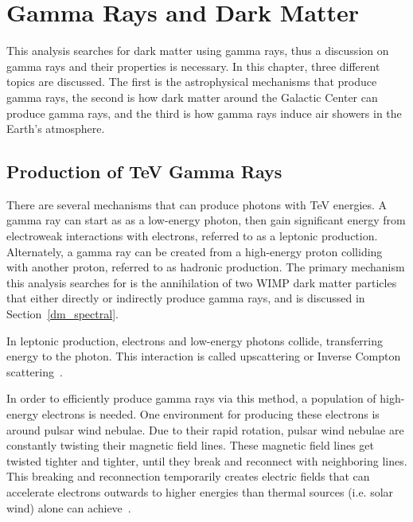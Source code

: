 \cleartooddpage[\thispagestyle{empty}]
\chapter{Gamma Rays and Dark Matter}\label{ch_gamma}


This analysis searches for dark matter using gamma rays, thus a discussion on gamma rays and their properties is necessary.
In this chapter, three different topics are discussed.
The first is the astrophysical mechanisms that produce gamma rays, the second is how dark matter around the Galactic Center can produce gamma rays, and the third is how gamma rays induce air showers in the Earth's atmosphere.

\section{Production of TeV Gamma Rays}

  There are several mechanisms that can produce photons with TeV energies.
  A gamma ray can start as as a low-energy photon, then gain significant energy from electroweak interactions with electrons, referred to as a leptonic production.
  Alternately, a gamma ray can be created from a high-energy proton colliding with another proton, referred to as hadronic production.
  The primary mechanism this analysis searches for is the annihilation of two WIMP dark matter particles that either directly or indirectly produce gamma rays, and is discussed in Section~\ref{dm_spectral}.

  In leptonic production, electrons and low-energy photons collide, transferring energy to the photon.
  This interaction is called upscattering or Inverse Compton scattering~\cite{compton_effect}.

  In order to efficiently produce gamma rays via this method, a population of high-energy electrons is needed.
  One environment for producing these electrons is around pulsar wind nebulae.
  Due to their rapid rotation, pulsar wind nebulae are constantly twisting their magnetic field lines.
  These magnetic field lines get twisted tighter and tighter, until they break and reconnect with neighboring lines.
  This breaking and reconnection temporarily creates electric fields that can accelerate electrons outwards to higher energies than thermal sources (i.e. solar wind) alone can achieve~\cite{gamma_pwn1,gamma_pwn2}.

